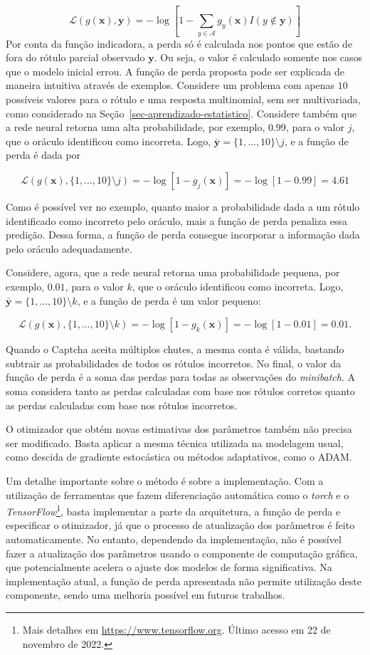 \documentclass[12pt,twoside,brazilian]{book}
\begin{document}
\[
\mathcal L(g(\mathbf x), {\mathbf y}) = -\log\left[1 - \sum_{y \in \mathcal A} {g_y}(\mathbf x) I(y\notin {\mathbf y})\right]
\] Por conta da função indicadora, a perda só é calculada nos pontos que
estão de fora do rótulo parcial observado \(\mathbf y\). Ou seja, o
valor é calculado somente nos casos que o modelo inicial errou. A função
de perda proposta pode ser explicada de maneira intuitiva através de
exemplos. Considere um problema com apenas \(10\) possíveis valores para
o rótulo e uma resposta multinomial, sem ser multivariada, como
considerado na Seção~\ref{sec-aprendizado-estatistico}. Considere também
que a rede neural retorna uma alta probabilidade, por exemplo, \(0.99\),
para o valor \(j\), que o oráculo identificou como incorreta. Logo,
\(\mathbf {\bar y} = \{1,\dots,10\}\setminus j\), e a função de perda é
dada por

\[
\mathcal L(g(\mathbf x), \{1,\dots,10\}\setminus j) = -\log\left[1-{g_j}(\mathbf x)\right] = -\log\left[1-0.99 \right] = 4.61
\]

Como é possível ver no exemplo, quanto maior a probabilidade dada a um
rótulo identificado como incorreto pelo oráculo, mais a função de perda
penaliza essa predição. Dessa forma, a função de perda consegue
incorporar a informação dada pelo oráculo adequadamente.

Considere, agora, que a rede neural retorna uma probabilidade pequena,
por exemplo, \(0.01\), para o valor \(k\), que o oráculo identificou
como incorreta. Logo, \(\mathbf {\bar y} = \{1,\dots,10\}\setminus k\),
e a função de perda é um valor pequeno:

\[
\mathcal L(g(\mathbf x), \{1,\dots,10\}\setminus k) = -\log\left[1-{g_k}(\mathbf x)\right] = -\log\left[1-0.01 \right] = 0.01.
\]

Quando o Captcha aceita múltiplos chutes, a mesma conta é válida,
bastando subtrair as probabilidades de todos os rótulos incorretos. No
final, o valor da função de perda é a soma das perdas para todas as
observações do \emph{minibatch}. A soma considera tanto as perdas
calculadas com base nos rótulos corretos quanto as perdas calculadas com
base nos rótulos incorretos.

O otimizador que obtém novas estimativas dos parâmetros também não
precisa ser modificado. Basta aplicar a mesma técnica utilizada na
modelagem usual, como descida de gradiente estocástica ou métodos
adaptativos, como o ADAM.

Um detalhe importante sobre o método é sobre a implementação. Com a
utilização de ferramentas que fazem diferenciação automática como o
\emph{torch} e o \emph{TensorFlow}\footnote{Mais detalhes em
  \url{https://www.tensorflow.org}. Último acesso em 22 de novembro de
  2022.}, basta implementar a parte da arquitetura, a função de perda e
especificar o otimizador, já que o processo de atualização dos
parâmetros é feito automaticamente. No entanto, dependendo da
implementação, não é possível fazer a atualização dos parâmetros usando
o componente de computação gráfica, que potencialmente acelera o ajuste
dos modelos de forma significativa. Na implementação atual, a função de
perda apresentada não permite utilização deste componente, sendo uma
melhoria possível em futuros trabalhos.
\end{document}
